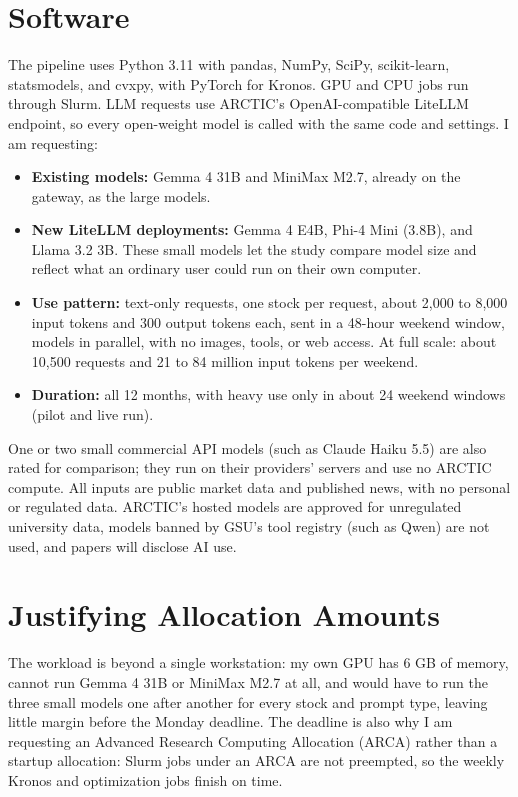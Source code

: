\documentclass[11pt,letterpaper]{article}
\begin{document}
\section{Software}
The pipeline uses Python 3.11 with pandas, NumPy, SciPy, scikit-learn, statsmodels, and cvxpy, with PyTorch for Kronos. GPU and CPU jobs run through Slurm. LLM requests use ARCTIC's OpenAI-compatible LiteLLM endpoint, so every open-weight model is called with the same code and settings. I am requesting:
\begin{itemize}
\item \textbf{Existing models:} Gemma 4 31B and MiniMax M2.7, already on the gateway, as the large models.
\item \textbf{New LiteLLM deployments:} Gemma 4 E4B, Phi-4 Mini (3.8B), and Llama 3.2 3B. These small models let the study compare model size and reflect what an ordinary user could run on their own computer.
\item \textbf{Use pattern:} text-only requests, one stock per request, about 2,000 to 8,000 input tokens and 300 output tokens each, sent in a 48-hour weekend window, models in parallel, with no images, tools, or web access. At full scale: about 10,500 requests and 21 to 84 million input tokens per weekend.
\item \textbf{Duration:} all 12 months, with heavy use only in about 24 weekend windows (pilot and live run).
\end{itemize}
One or two small commercial API models (such as Claude Haiku 5.5) are also rated for comparison; they run on their providers' servers and use no ARCTIC compute. All inputs are public market data and published news, with no personal or regulated data. ARCTIC's hosted models are approved for unregulated university data, models banned by GSU's tool registry (such as Qwen) are not used, and papers will disclose AI use.

\section{Justifying Allocation Amounts}
The workload is beyond a single workstation: my own GPU has 6 GB of memory, cannot run Gemma 4 31B or MiniMax M2.7 at all, and would have to run the three small models one after another for every stock and prompt type, leaving little margin before the Monday deadline. The deadline is also why I am requesting an Advanced Research Computing Allocation (ARCA) rather than a startup allocation: Slurm jobs under an ARCA are not preempted, so the weekly Kronos and optimization jobs finish on time.
\end{document}

